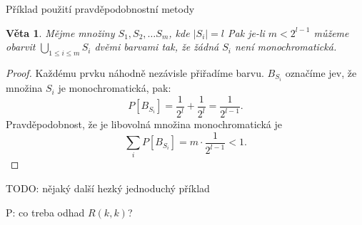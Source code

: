 \documentclass[a4paper,10pt,titlepage]{article} \usepackage[utf8]{inputenc}
\newtheorem{theorem}{Věta}
\begin{document}
Příklad použití pravděpodobnostní metody
\begin{theorem}
Mějme množiny $S_1, S_2, \ldots S_m$, kde $|S_i| = l$
Pak je-li $m < 2^{l-1}$ můžeme obarvit $\bigcup_{1\leq i \leq m} S_i$ dvěmi barvami tak, že žádná $S_i$ není monochromatická.
\end{theorem}

\begin{proof}
Každému prvku náhodně nezávisle přiřadíme barvu.
$B_{S_i}$ označíme jev, že množina $S_i$ je monochromatická, pak:
\[
	P[B_{S_i}] = \frac{1}{2^l} + \frac{1}{2^l} = \frac{1}{2^{l-1}}.
\]
Pravděpodobnost, že je libovolná množina monochromatická je 
\[
	\sum_i P[B_{S_i}] = m \cdot \frac{1}{2^{l-1}} < 1.
\]
\end{proof}

TODO: nějaký další hezký jednoduchý příklad

P: co treba odhad $R(k, k)$?
\end{document}
